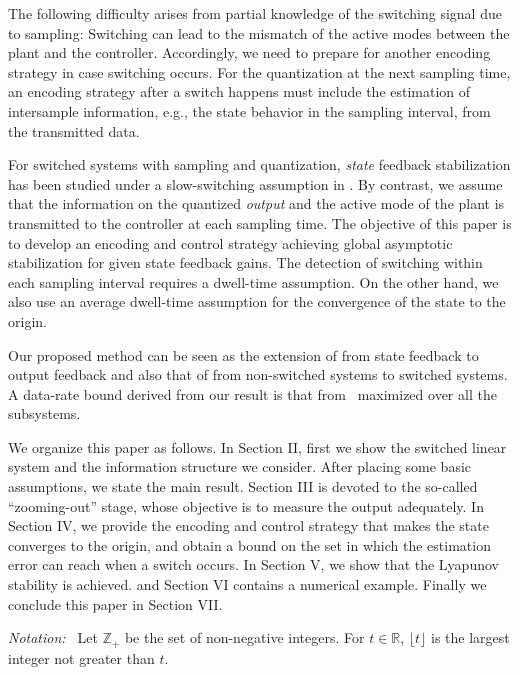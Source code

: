 \documentclass[letterpaper, 11pt, onecolumn]{ieeeconf}  \IEEEoverridecommandlockouts
\begin{document}
The following difficulty arises from partial knowledge of the switching signal
due to sampling:
Switching can lead to the mismatch of the active modes between
the plant and the controller.
Accordingly, 
we need to prepare for another encoding strategy in case switching occurs.
For the quantization at the next sampling time, an encoding strategy
after a switch happens
must include the estimation of intersample information, e.g., the state behavior
in the sampling interval, from the transmitted data.

For switched systems with sampling and quantization, 
{\em state} feedback stabilization
has been studied under a slow-switching assumption
in \cite{Liberzon2014,Wakaiki2014IFAC}.
By contrast,
we assume that the information on 
the quantized {\em output} and the active mode of the plant
is transmitted to the controller at each sampling time.
The objective of this paper is to
develop an encoding and control strategy
achieving global asymptotic stabilization for given state feedback gains. 
The detection of switching within each sampling interval requires
a dwell-time assumption. On the other hand, we also use an average dwell-time
assumption for the convergence of the state to the origin.

Our proposed method can be seen as the extension of
\cite{Liberzon2014} from state feedback to output feedback
and also
that of \cite{Liberzon2003} from non-switched systems to switched systems.
A data-rate bound derived from our result is that from~\cite{Liberzon2003}
maximized over all the subsystems.



We organize this paper as follows. In Section II, first we show the switched 
linear system and the information structure we consider. After placing 
some basic assumptions, we state the main result.
Section III is devoted to the so-called ``zooming-out'' stage, whose objective
is to measure the output adequately.
In Section IV, we provide the encoding and control strategy 
that makes the state converges to the origin, and 
obtain a bound on the set in which the estimation error can reach when
a switch occurs.
In Section V, we show that the Lyapunov stability is achieved.
and Section VI contains a numerical example. 
Finally we conclude this paper in Section VII.








{\it Notation:~}
Let $\mathbb{Z}_+$ be the set of non-negative integers.
For $t \in \mathbb{R}$, $\lfloor t\rfloor$ is the largest integer not 
greater than $t$.
\end{document}
